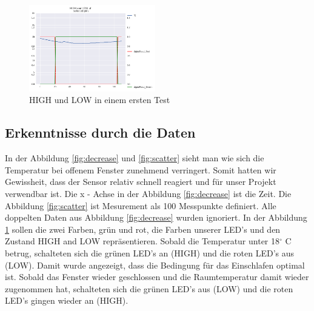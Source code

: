 \documentclass{article}
\begin{document}
\vfill
\begin{figure}[!h]
\begin{center}
\includegraphics[width=0.49\textwidth]{digitalRead.png}
\caption{HIGH und LOW in einem ersten Test}
\label{fig:highlow}
\end{center}
\end{figure}
\newpage
\subsection{Erkenntnisse durch die Daten}
In der Abbildung \ref{fig:decrease} und \ref{fig:scatter} sieht man wie sich die Temperatur bei offenem Fenster zunehmend verringert. Somit hatten wir Gewissheit, dass der Sensor relativ schnell reagiert und für unser Projekt verwendbar ist. Die x - Achse in der Abbildung \ref{fig:decrease} ist die Zeit. Die Abbildung \ref{fig:scatter} ist Mesurement als 100 Messpunkte definiert. Alle doppelten Daten aus Abbildung \ref{fig:decrease} wurden ignoriert. In der Abbildung \ref{fig:highlow} sollen die zwei Farben, grün und rot, die Farben unserer LED’s und den Zustand HIGH and LOW repräsentieren. Sobald die Temperatur unter 18$^\circ$ C betrug, schalteten sich die grünen LED’s an (HIGH) und die roten LED’s aus (LOW). Damit wurde angezeigt, dass die Bedingung für das Einschlafen optimal ist. Sobald das Fenster wieder geschlossen und die Raumtemperatur damit wieder zugenommen hat, schalteten sich die grünen LED’s aus (LOW) und die roten LED’s gingen wieder an (HIGH).
\end{document}
